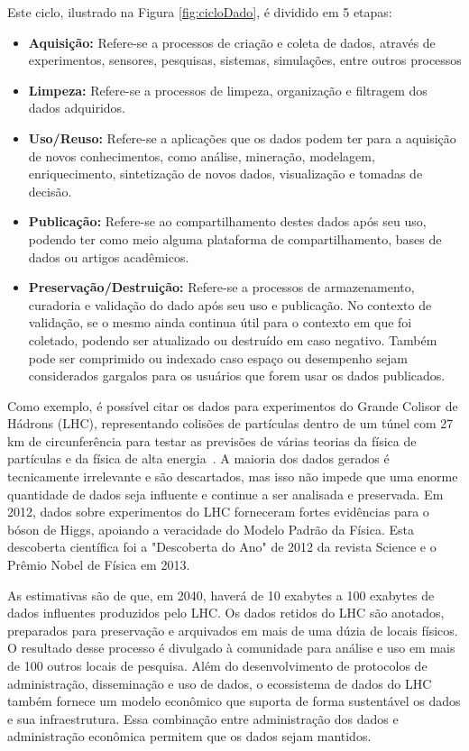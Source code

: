 \documentclass[Portugues,Final]{ic-tese-v3}
\begin{document}
Este ciclo, ilustrado na Figura \ref{fig:cicloDado}, é dividido em 5 etapas:

\begin{itemize}
\item \textbf{Aquisição:} Refere-se a processos de criação e coleta de dados, através de experimentos, sensores, pesquisas, sistemas, simulações, entre outros processos
\item \textbf{Limpeza:} Refere-se a processos de limpeza, organização e filtragem dos dados adquiridos.
\item \textbf{Uso/Reuso:} Refere-se a aplicações que os dados podem ter para a aquisição de novos conhecimentos, como análise, mineração, modelagem, enriquecimento, sintetização de novos dados, visualização e tomadas de decisão.
\item \textbf{Publicação:} Refere-se ao compartilhamento destes dados após seu uso, podendo ter como meio alguma plataforma de compartilhamento, bases de dados ou artigos acadêmicos.
\item \textbf{Preservação/Destruição:} Refere-se a processos de armazenamento, curadoria e validação do dado após seu uso e publicação. No contexto de validação, se o mesmo ainda continua útil para o contexto em que foi coletado, podendo ser atualizado ou destruído em caso negativo. Também pode ser comprimido ou indexado caso espaço ou desempenho sejam considerados gargalos para os usuários que forem usar os dados publicados.
\end{itemize}

Como exemplo, é possível citar os dados para experimentos do Grande Colisor de Hádrons (LHC), representando colisões de partículas dentro de um túnel com 27 km de circunferência para testar as previsões de várias teorias da física de partículas e da física de alta energia~\cite{Berman_2018}. A maioria dos dados gerados é tecnicamente irrelevante e são descartados, mas isso não impede que uma enorme quantidade de dados seja influente e continue a ser analisada e preservada. Em 2012, dados sobre experimentos do LHC forneceram fortes evidências para o bóson de Higgs, apoiando a veracidade do Modelo Padrão da Física. Esta descoberta científica foi a "Descoberta do Ano" de 2012 da revista Science e o Prêmio Nobel de Física em 2013.

As estimativas são de que, em 2040, haverá de 10 exabytes a 100 exabytes de dados influentes produzidos pelo LHC. Os dados retidos do LHC são anotados, preparados para preservação e arquivados em mais de uma dúzia de locais físicos. O resultado desse processo é divulgado à comunidade para análise e uso em mais de 100 outros locais de pesquisa. Além do desenvolvimento de protocolos de administração, disseminação e uso de dados, o ecossistema de dados do LHC também fornece um modelo econômico que suporta de forma sustentável os dados e sua infraestrutura. Essa combinação entre administração dos dados e administração econômica permitem que os dados sejam mantidos.
\end{document}
